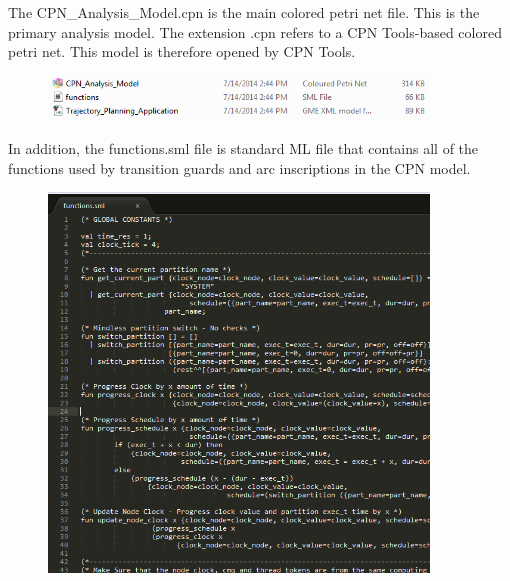 The CPN\_Analysis\_Model.cpn is the main colored petri net file. This is the primary analysis model. The extension .cpn refers to a CPN Tools-based colored petri net. This model is therefore opened by CPN Tools. 

\begin{figure}[ht]
\centering
\includegraphics[width=0.9\textwidth]{./figs/generated}
\label{fig:generated}
\vspace{-0.2in}
\end{figure}
\vspace{0.1in} 

In addition, the functions.sml file is standard ML file that contains all of the functions used by transition guards and arc inscriptions in the CPN model.

\begin{figure}[ht]
\centering
\includegraphics[width=0.9\textwidth]{./figs/functions}
\label{fig:functions}
\vspace{-0.2in}
\end{figure}
\vspace{0.1in} 



